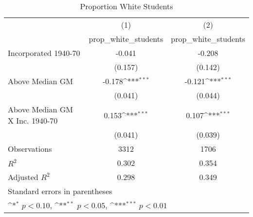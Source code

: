 \begin{table}[htbp]\centering
\def\sym#1{\ifmmode^{#1}\else\(^{#1}\)\fi}
\caption{Proportion White Students}
\begin{tabular}{l*{2}{c}}
\hline\hline
                    &\multicolumn{1}{c}{(1)}&\multicolumn{1}{c}{(2)}\\
                    &\multicolumn{1}{c}{prop\_white\_students}&\multicolumn{1}{c}{prop\_white\_students}\\
\hline
Incorporated 1940-70&      -0.041         &      -0.208         \\
                    &     (0.157)         &     (0.142)         \\
[1em]
Above Median GM     &      -0.178\sym{***}&      -0.121\sym{***}\\
                    &     (0.041)         &     (0.044)         \\
[1em]
Above Median GM X Inc. 1940-70&       0.153\sym{***}&       0.107\sym{***}\\
                    &     (0.041)         &     (0.039)         \\
\hline
Observations        &        3312         &        1706         \\
\(R^{2}\)           &       0.302         &       0.354         \\
Adjusted \(R^{2}\)  &       0.298         &       0.349         \\
\hline\hline
\multicolumn{3}{l}{\footnotesize Standard errors in parentheses}\\
\multicolumn{3}{l}{\footnotesize \sym{*} \(p<0.10\), \sym{**} \(p<0.05\), \sym{***} \(p<0.01\)}\\
\end{tabular}
\end{table}

